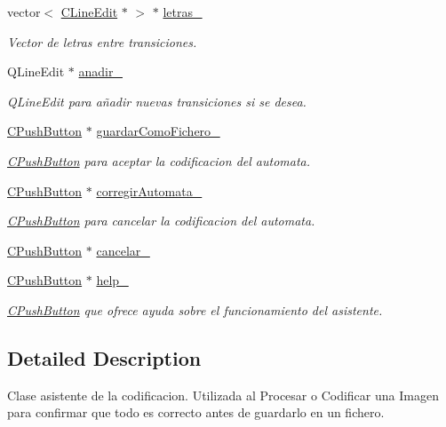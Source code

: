 \begin{DoxyCompactItemize}
vector$<$ \hyperlink{classCLineEdit}{C\+Line\+Edit} $\ast$ $>$ $\ast$ \hyperlink{classCAsistenteCodificacion_ac96318b5bc263836fb7d27269965e7c5}{letras\+\_\+}
\begin{DoxyCompactList}\small\item\em Vector de letras entre transiciones. \end{DoxyCompactList}\item 
Q\+Line\+Edit $\ast$ \hyperlink{classCAsistenteCodificacion_a42afd383b49f23e25fa26e1327dac06b}{anadir\+\_\+}
\begin{DoxyCompactList}\small\item\em Q\+Line\+Edit para añadir nuevas transiciones si se desea. \end{DoxyCompactList}\item 
\hyperlink{classCPushButton}{C\+Push\+Button} $\ast$ \hyperlink{classCAsistenteCodificacion_a898ca68d14748bb8bd7d4694e80d3da8}{guardar\+Como\+Fichero\+\_\+}
\begin{DoxyCompactList}\small\item\em \hyperlink{classCPushButton}{C\+Push\+Button} para aceptar la codificacion del automata. \end{DoxyCompactList}\item 
\hyperlink{classCPushButton}{C\+Push\+Button} $\ast$ \hyperlink{classCAsistenteCodificacion_afd75aaa033b9e2147f82bdb64db6fecf}{corregir\+Automata\+\_\+}
\begin{DoxyCompactList}\small\item\em \hyperlink{classCPushButton}{C\+Push\+Button} para cancelar la codificacion del automata. \end{DoxyCompactList}\item 
\hyperlink{classCPushButton}{C\+Push\+Button} $\ast$ \hyperlink{classCAsistenteCodificacion_a38cc5ae5adde6fa070e0ce0974de7778}{cancelar\+\_\+}
\item 
\hyperlink{classCPushButton}{C\+Push\+Button} $\ast$ \hyperlink{classCAsistenteCodificacion_a8d7ffb128dc1d576413d2a9a74f3884f}{help\+\_\+}
\begin{DoxyCompactList}\small\item\em \hyperlink{classCPushButton}{C\+Push\+Button} que ofrece ayuda sobre el funcionamiento del asistente. \end{DoxyCompactList}\end{DoxyCompactItemize}


\subsection{Detailed Description}
Clase asistente de la codificacion. Utilizada al Procesar o Codificar una Imagen para confirmar que todo es correcto antes de guardarlo en un fichero. 

